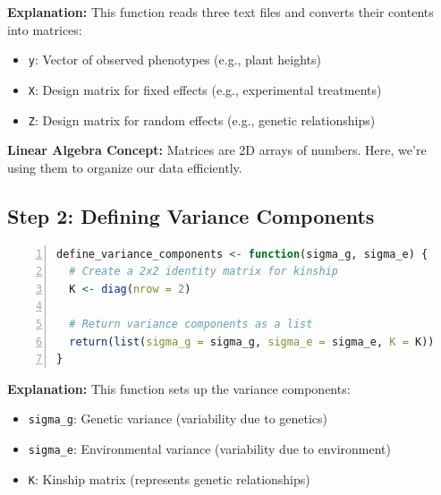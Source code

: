 \documentclass[12pt,a4paper]{article}
\begin{document}
\textbf{Explanation:} 
This function reads three text files and converts their contents into matrices:
\begin{itemize}
  \item \texttt{y}: Vector of observed phenotypes (e.g., plant heights)
  \item \texttt{X}: Design matrix for fixed effects (e.g., experimental treatments)
  \item \texttt{Z}: Design matrix for random effects (e.g., genetic relationships)
\end{itemize}

\textbf{Linear Algebra Concept:} Matrices are 2D arrays of numbers. Here, we're using them to organize our data efficiently.

\subsection{Step 2: Defining Variance Components}

\begin{lstlisting}[language=R, 
                   caption=Step 2: Defining Variance Components,
                   basicstyle=\ttfamily\footnotesize,
                   keywordstyle=\color{blue},
                   stringstyle=\color{red},
                   commentstyle=\color{green!60!black},
                   numbers=left,
                   numberstyle=\tiny\color{gray},
                   frame=single,
                   breaklines=true,
                   linewidth=0.95\textwidth,
                   columns=flexible,
                   xleftmargin=0.05\textwidth,
                   xrightmargin=0.05\textwidth]
define_variance_components <- function(sigma_g, sigma_e) {
  # Create a 2x2 identity matrix for kinship
  K <- diag(nrow = 2)
  
  # Return variance components as a list
  return(list(sigma_g = sigma_g, sigma_e = sigma_e, K = K))
}
\end{lstlisting}

\textbf{Explanation:}
This function sets up the variance components:
\begin{itemize}
  \item \texttt{sigma\_g}: Genetic variance (variability due to genetics)
  \item \texttt{sigma\_e}: Environmental variance (variability due to environment)
  \item \texttt{K}: Kinship matrix (represents genetic relationships)
\end{itemize}
\end{document}
